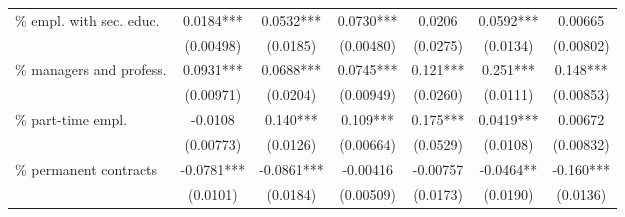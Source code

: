 {\begin{threeparttable}
\begin{tabular}{l*{6}{S}}
\% empl. with sec. educ.                    &       0.0184***   & 0.0532***   & 0.0730***  & 0.0206      & 0.0592***  & 0.00665      \\
                                            &       (0.00498)   & (0.0185)    & (0.00480)  & (0.0275)    & (0.0134)   & (0.00802)    \\[1ex]
\% managers and profess.                    &       0.0931***   & 0.0688***   & 0.0745***  & 0.121***    & 0.251***   & 0.148***     \\
                                            &       (0.00971)   & (0.0204)    & (0.00949)  & (0.0260)    & (0.0111)   & (0.00853)    \\[1ex]
\% part-time empl.                          &       -0.0108     & 0.140***    & 0.109***   & 0.175***    & 0.0419***  & 0.00672      \\
                                            &       (0.00773)   & (0.0126)    & (0.00664)  & (0.0529)    & (0.0108)   & (0.00832)    \\[1ex]
\% permanent contracts                      &       -0.0781***  & -0.0861***  & -0.00416   & -0.00757    & -0.0464**  & -0.160***    \\
                                            &       (0.0101)    & (0.0184)    & (0.00509)  & (0.0173)    & (0.0190)   & (0.0136)     \\[1ex]


\end{tabular}
\end{threeparttable}}
